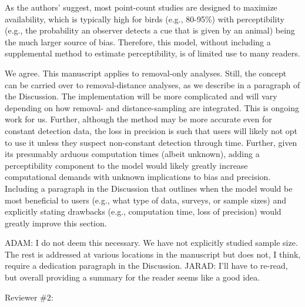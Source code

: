 \documentclass[12pt]{article}
\renewenvironment{quote}  %
              {\list{}{\rightmargin\leftmargin}\normalfont%
               \item\relax}
              {\endlist}
\newcommand{\adam}[1]{{\color{blue} ADAM: #1}}
\newcommand{\jarad}[1]{{\color{Orange} JARAD: #1}}
\begin{document}
As the authors’ suggest, most point-count studies are designed to maximize availability, which is typically high for birds (e.g., 80-95\%) with perceptibility (e.g., the probability an observer detects a cue that is given by an animal) being the much larger source of bias.  Therefore, this model, without including a supplemental method to estimate perceptibility, is of limited use to many readers.
\begin{quote}
We agree.
This manuscript applies to removal-only analyses.
Still, the concept can be carried over to removal-distance analyses, as we describe in a paragraph of the Discussion.
The implementation will be more complicated and will vary depending on how removal- and distance-sampling are integrated.
This is ongoing work for us.
\end{quote}
Further, although the method may be more accurate even for constant detection data, the loss in precision is such that users will likely not opt to use it unless they suspect non-constant detection through time.  Further, given its presumably arduous computation times (albeit unknown), adding a perceptibility component to the model would likely greatly increase computational demands with unknown implications to bias and precision.  Including a paragraph in the Discussion that outlines when the model would be most beneficial to users (e.g., what type of data, surveys, or sample sizes) and explicitly stating drawbacks (e.g., computation time, loss of precision) would greatly improve this section.  
\begin{quote}
\adam{I do not deem this necessary.  We have not explicitly studied sample size.  The rest is addressed at various locations in the manuscript but does not, I think, require a dedication paragraph in the Discussion.}
\jarad{I'll have to re-read, but overall providing a summary for the reader
seems like a good idea.}
\end{quote}

\newpage



Reviewer \#2:
\end{document}
